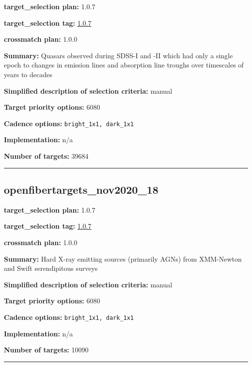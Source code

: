 \noindent\textbf{target\_selection plan:} 1.0.7

\noindent\textbf{target\_selection tag:}
\href{https://github.com/sdss/target_selection/tree/1.0.7/}{1.0.7}

\noindent\textbf{crossmatch plan:} 1.0.0

\noindent\textbf{Summary:} Quasars observed during SDSS-I and -II which had only
a single epoch to changes in emission lines and absorption line troughs
over timescales of years to decades

\noindent\textbf{Simplified description of selection criteria:} manual


\noindent\textbf{Target priority options:} 6080

\noindent\textbf{Cadence options:} \texttt{bright\_1x1,\ dark\_1x1}

\noindent\textbf{Implementation:} n/a

\noindent\textbf{Number of targets:} 39684

\begin{center}\rule{0.5\linewidth}{0.5pt}\end{center}

\hypertarget{openfibertargets_nov2020_18_plan1.0.7}{%
\subsection{openfibertargets\_nov2020\_18}\label{openfibertargets_nov2020_18_plan1.0.7}}

\noindent\textbf{target\_selection plan:} 1.0.7

\noindent\textbf{target\_selection tag:}
\href{https://github.com/sdss/target_selection/tree/1.0.7/}{1.0.7}

\noindent\textbf{crossmatch plan:} 1.0.0

\noindent\textbf{Summary:} Hard X-ray emitting sources (primarily AGNs) from
XMM-Newton and Swift serendipitous surveys

\noindent\textbf{Simplified description of selection criteria:} manual


\noindent\textbf{Target priority options:} 6080

\noindent\textbf{Cadence options:} \texttt{bright\_1x1,\ dark\_1x1}

\noindent\textbf{Implementation:} n/a

\noindent\textbf{Number of targets:} 10090

\begin{center}\rule{0.5\linewidth}{0.5pt}\end{center}

